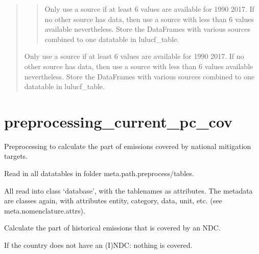 \documentclass[letterpaper,10pt,english]{sphinxmanual}
\begin{document}
\begin{quote}
\begin{quote}

Only use a source if at least 6 values are available for 1990 \sphinxhyphen{} 2017.
If no other source has data, then use a source with less than 6 values available nevertheless.
Store the DataFrames with various sources combined to one datatable in lulucf\_table.
\end{quote}

Only use a source if at least 6 values are available for 1990 \sphinxhyphen{} 2017.
If no other source has data, then use a source with less than 6 values available nevertheless.
Store the DataFrames with various sources combined to one datatable in lulucf\_table.
\end{quote}


\chapter{preprocessing\_current\_pc\_cov}
\label{\detokenize{code:preprocessing-current-pc-cov}}
Preprocessing to calculate the part of emissions covered by national mitigation targets.

Read in all datatables in folder meta.path.preprocess/tables.

All read into class ‘database’, with the tablenames as attributes.
The meta\sphinxhyphen{}data are classes again, with attributes entity, category, data, unit, etc. (see meta.nomenclature.attrs).

Calculate the part of historical emissions that is covered by an NDC.

If the country does not have an (I)NDC: nothing is covered.
\end{document}
